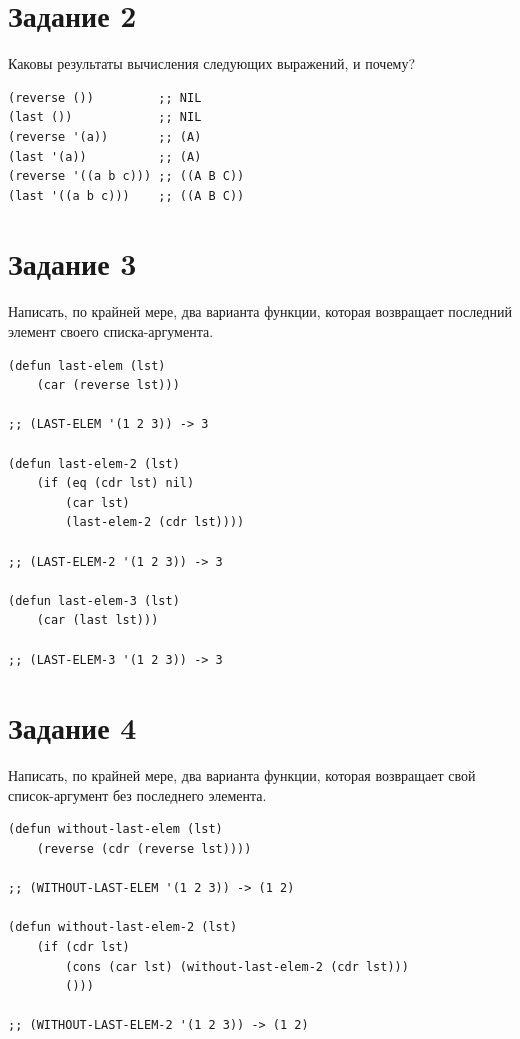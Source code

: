 \documentclass[a4paper,14pt, unknownkeysallowed]{extreport}
\begin{document}
\section{Задание 2}

Каковы результаты вычисления следующих выражений, и почему?

\begin{center}
\captionsetup{justification=raggedright,singlelinecheck=off}
\begin{lstlisting}[label=lst:parallel_processing,caption=Решение задания 2]
(reverse ())         ;; NIL
(last ())            ;; NIL
(reverse '(a))       ;; (A)
(last '(a))          ;; (A)
(reverse '((a b c))) ;; ((A B C))
(last '((a b c)))    ;; ((A B C))
\end{lstlisting}
\end{center}

\clearpage

\section{Задание 3}

Написать, по крайней мере, два варианта функции, которая возвращает последний элемент своего списка-аргумента.

\begin{center}
\captionsetup{justification=raggedright,singlelinecheck=off}
\begin{lstlisting}[label=lst:parallel_processing,caption=Решение задания 3]
(defun last-elem (lst)
    (car (reverse lst)))

;; (LAST-ELEM '(1 2 3)) -> 3

(defun last-elem-2 (lst)
    (if (eq (cdr lst) nil) 
        (car lst) 
    	(last-elem-2 (cdr lst))))

;; (LAST-ELEM-2 '(1 2 3)) -> 3

(defun last-elem-3 (lst)
    (car (last lst)))

;; (LAST-ELEM-3 '(1 2 3)) -> 3
\end{lstlisting}
\end{center}

\section{Задание 4}

Написать, по крайней мере, два варианта функции, которая возвращает свой список-аргумент без последнего элемента.

\begin{center}
\captionsetup{justification=raggedright,singlelinecheck=off}
\begin{lstlisting}[label=lst:parallel_processing,caption=Решение задания 4]
(defun without-last-elem (lst)
    (reverse (cdr (reverse lst))))

;; (WITHOUT-LAST-ELEM '(1 2 3)) -> (1 2)

(defun without-last-elem-2 (lst)
    (if (cdr lst)
        (cons (car lst) (without-last-elem-2 (cdr lst)))
        ()))

;; (WITHOUT-LAST-ELEM-2 '(1 2 3)) -> (1 2)
\end{lstlisting}
\end{center}
\end{document}
